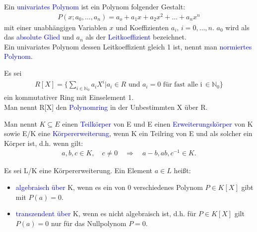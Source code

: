 \begin{definition}
Ein \textcolor{blue}{univariates Polynom} ist ein Polynom folgender Gestalt:
\begin{align*}
P(x; a_0,\ldots,a_n) = a_o + a_1x + a_2x^2 + \ldots + a_nx^n
\end{align*}
mit einer unabhängigen Variablen $x$ und Koeffizienten $a_i, \, i = 0,\ldots,n$. $a_0$ wird als das \textcolor{blue}{absolute Glied} und $a_n$ als der \textcolor{blue}{Leitkoeffizient} bezeichnet.\\
Ein univariates Polynom dessen Leitkoeffizient gleich 1 ist, nennt man \textcolor{blue}{normiertes Polynom}. \cite{Ausgangsartikel}
\end{definition}

\begin{definition}
Es sei 
\begin{align*}
R[X] = \{\sum_{i\in\mathbb{N}_0} a_i X^i |a_i \in R \text{ und } a_i = 0 \text{ für fast alle i} \,\in \mathbb{N}_0 \}
\end{align*}
ein kommutativer Ring mit Einselement 1. \\
Man nennt R[X] den \textcolor{blue}{Polynomring} in der Unbestimmten X über R. \cite{Karpfinger}
\end{definition}

\begin{definition}
Man nennt $K \subseteq E$ einen \textcolor{blue}{Teilkörper} von E und E einen \textcolor{blue}{Erweiterungskörper} von K sowie E/K eine \textcolor{blue}{Körpererweiterung}, wenn K ein Teilring von E und als solcher ein Körper ist, d.h. wenn gilt\cite{Karpfinger}:
\begin{align*}
a, b, c\in K, \quad c \neq 0 \quad \Rightarrow \quad a-b,ab,c^{-1}\in K. 
\end{align*} 
\end{definition}

\begin{definition}
Es sei L/K eine Körpererweiterung. Ein Element $a \in L$ heißt:
\begin{itemize}
\item \textcolor{blue}{algebraisch über} K, wenn es ein von 0 verschiedenes Polynom $P \in K[X]$ gibt mit $P(a) = 0$.
\item \textcolor{blue}{transzendent über} K, wenn es nicht algebraisch ist, d.h. für $P \in K[X]$ gilt $P(a) = 0$ nur für das Nullpolynom $P = 0$. \cite{Karpfinger}  
\end{itemize} 
\end{definition}

